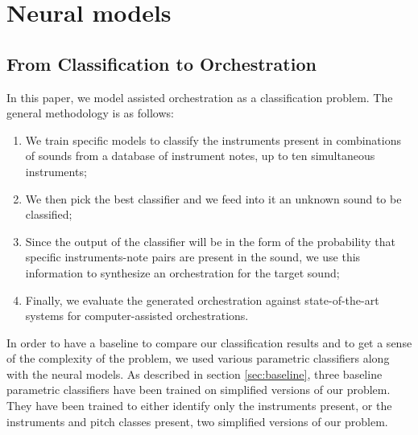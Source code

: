 \documentclass[runningheads,a4paper]{llncs}
\begin{document}
\section{Neural models}
\label{sec:models}

\subsection{From Classification to Orchestration}

In this paper, we model assisted orchestration as a classification problem. The general methodology is as follows:

\begin{enumerate}
\item We train specific models to classify the instruments present in combinations of sounds from a database of instrument notes, up to ten simultaneous instruments;
\item We then pick the best classifier and we feed into it an unknown sound to be classified;
\item Since the output of the classifier will be in the form of the probability that specific instruments-note pairs are present in the sound, we use this information to synthesize an orchestration for the target sound;
\item Finally, we evaluate the generated orchestration against state-of-the-art systems for computer-assisted orchestrations.
\end{enumerate}

In order to have a baseline to compare our classification results and to get a sense of the complexity of the problem, we used various parametric classifiers along with the neural models. As described in section \ref{sec:baseline}, three baseline parametric classifiers have been trained on simplified versions of our problem. They have been trained to either identify only the instruments present, or the instruments and pitch classes present, two simplified versions of our problem.
\end{document}
